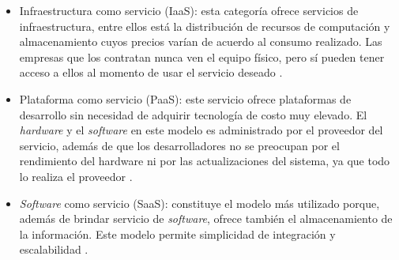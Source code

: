 \begin{itemize}
\item Infraestructura como servicio (IaaS): esta categoría ofrece servicios de infraestructura, entre ellos está la distribución de recursos de computación y almacenamiento cuyos precios varían de acuerdo al consumo realizado. Las empresas que los contratan nunca ven el equipo físico, pero sí pueden tener acceso a ellos al momento de usar el servicio deseado \citep{BOOK:2}.




\item Plataforma como servicio (PaaS): este servicio ofrece plataformas de desarrollo sin necesidad de adquirir tecnología de costo muy elevado. El \emph{hardware} y el \emph{software} en este modelo es administrado por el proveedor del servicio, además de que los desarrolladores no se preocupan por el rendimiento del hardware ni por las actualizaciones del sistema, ya que todo lo realiza el proveedor \citep{BOOK:2}.
 





\item \emph{Software} como servicio (SaaS): constituye el modelo más utilizado porque, además de brindar servicio de \emph{software}, ofrece también el almacenamiento de la información. Este modelo permite simplicidad de integración y escalabilidad \citep{BOOK:2}. 



\vspace{0.5cm}

\end{itemize}

